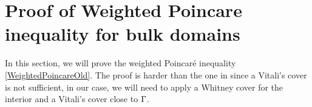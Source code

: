     

\section{ Proof of Weighted Poincare inequality for bulk domains}
\label{sec:wPoincare}
In this section, we will prove the weighted Poincaré inequality \ref{WeightedPoincareOld}. The proof is harder than the one in \cite{conti0} since a Vitali's cover is not sufficient, in our case, we will need to apply a Whitney cover for the interior and a Vitali's cover close to $\Gamma$.
